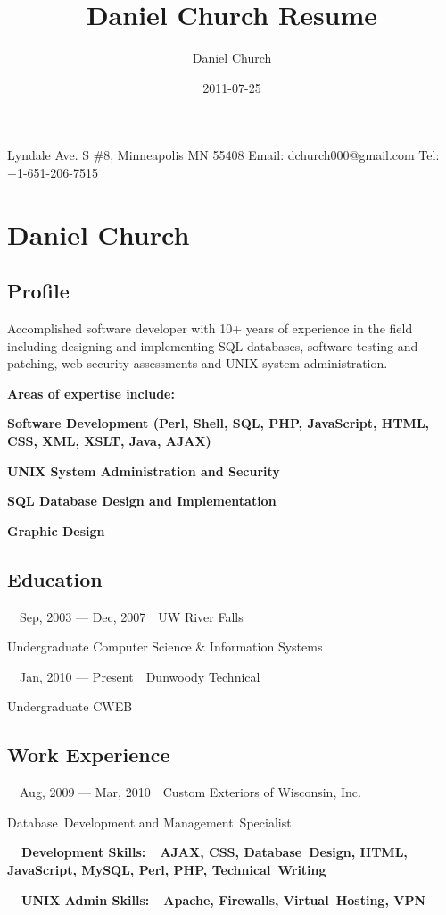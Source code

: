 \documentclass[letterpaper]{article}
\title{Daniel Church Resume}
\author{Daniel Church}
\date{2011-07-25}
\begin{document}
{\centering{} Lyndale Ave. S \#8, Minneapolis MN 55408\newline
Email: dchurch000@gmail.com Tel: +1-651-206-7515
\par}

\section[Daniel Church]{Daniel Church}
\subsection[Profile]{Profile}
Accomplished software developer with 10+ years of experience in the field including designing and implementing SQL databases, software testing and patching, web security assessments and UNIX system administration.

{\bfseries
Areas of expertise include:}

{\bfseries
Software Development (Perl, Shell, SQL, PHP, JavaScript, HTML, CSS, XML, XSLT, Java, AJAX)}

{\bfseries
UNIX System Administration and Security}

{\bfseries
SQL Database Design and Implementation}

{\bfseries
Graphic Design}

\subsection[Education]{Education}
\ \ Sep, 2003 --- Dec, 2007\ \ UW River Falls

Undergraduate\newline
Computer Science \& Information Systems

\ \ Jan, 2010 --- Present\ \ Dunwoody Technical

Undergraduate\newline
CWEB

\subsection[Work Experience]{Work Experience}
\ \ Aug, 2009 --- Mar, 2010\ \ Custom Exteriors of Wisconsin, Inc.

Database~Development and Management~Specialist

{\bfseries
\ \ Development Skills:\ \ AJAX, CSS, Database~Design, HTML, JavaScript, MySQL, Perl, PHP, Technical~Writing}

{\bfseries
\ \ UNIX Admin Skills:\ \ Apache, Firewalls, Virtual~Hosting, VPN}
\end{document}
